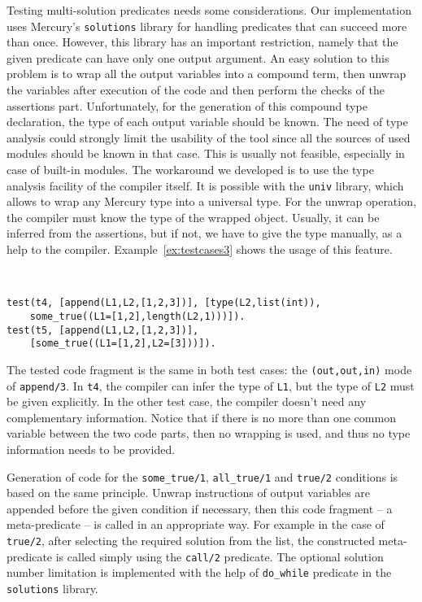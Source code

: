 \documentclass[british]{llncs}
\begin{document}
Testing multi-solution predicates needs some considerations. Our implementation
uses Mercury's \texttt{solutions} library for handling predicates
that can succeed more than once. However, this library has an important
restriction, namely that the given predicate can have only one output
argument. An easy solution to this problem is to wrap all the output
variables into a compound term, then
unwrap the variables after execution of the code and then perform the checks of the assertions part. Unfortunately,
for the generation of this compound type declaration, the type of
each output variable should be known. The need of type analysis could strongly limit
the usability of the tool since all the
sources of used modules should be known in that case. This is usually not feasible, especially
in case of built-in modules. The workaround we developed is to use the type analysis facility of the compiler itself. It is
possible with the \texttt{univ} library, which allows to wrap any Mercury type
into a universal type. For the unwrap operation, the compiler must
know the type of the wrapped object. Usually, it can be inferred from
the assertions, but if not, we have to give the type manually, as
a help to the compiler. Example~\ref{ex:testcases3} shows the usage of this feature.

\begin{example}\label{ex:testcases3}\ \\
\vspace*{-0.5 cm}
\begin{lstlisting}[basicstyle={\ttfamily},breaklines=true,tabsize=4]
test(t4, [append(L1,L2,[1,2,3])], [type(L2,list(int)), 
	some_true((L1=[1,2],length(L2,1)))]).
test(t5, [append(L1,L2,[1,2,3])], 
	[some_true((L1=[1,2],L2=[3]))]).
\end{lstlisting}


\noindent The tested code fragment is the same in both test cases:
the \texttt{(out,out,in)} mode of \texttt{append/3}. In \texttt{t4}, the compiler
can infer the type of \texttt{L1}, but the type of \texttt{L2} must
be given explicitly. In the other test case, the compiler doesn't
need any complementary information. Notice that if there is no
more than one common variable between the two code parts, then no
wrapping is used, and thus no type information needs to be provided.
\end{example}


Generation of code for the \texttt{some\_true/1}, \texttt{all\_true/1}
and \texttt{true/2} conditions is based on the same principle. Unwrap
instructions of output variables are appended before the given condition
if necessary, then this code fragment -- a meta-predicate -- is called
in an appropriate way. For example in the case of \texttt{true/2}, after selecting
the required solution from the list, the constructed meta-predicate
is called simply using the \texttt{call/2} predicate. 
The optional solution
number limitation is implemented with the help of \texttt{do\_while}
predicate in the \texttt{solutions} library.
\end{document}

